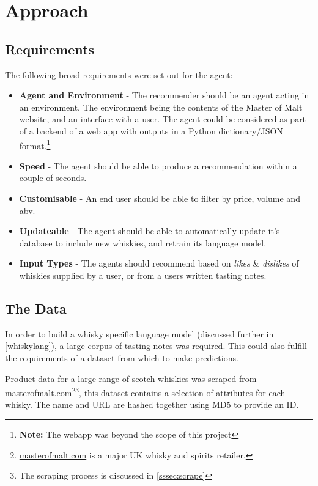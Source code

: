 \section{Approach}\label{sec:approach}
\subsection{Requirements}
The following broad requirements were set out for the agent:
\begin{itemize}
    \item \textbf{Agent and Environment} - The recommender should be an agent acting in an environment. 
    The environment being the contents of the Master of Malt website, and an interface with a user.
    The agent could be considered as part of a backend of a web app with outputs in a Python dictionary/JSON
    format.\footnote{\textbf{Note:} The webapp was beyond the scope of this project}
    \item \textbf{Speed} - The agent should be able to produce a recommendation
    within a couple of seconds.
    \item \textbf{Customisable} - An end user should be able to filter by price,
    volume and abv.
    \item \textbf{Updateable} - The agent should be able to automatically update
    it's database to include new whiskies, and retrain its language model.
    \item \textbf{Input Types} - The agents should recommend based on \emph{likes} 
    \& \emph{dislikes} of whiskies supplied by a user, or from a users written 
    tasting notes.
\end{itemize}

\subsection{The Data}
In order to build a whisky specific language model (discussed further in
\autoref{whiskylang}), a large corpus of tasting notes was required. This could
also fulfill the requirements of a dataset from which to make predictions.

Product data for a large range of scotch whiskies was scraped from
\href{http://masterofmalt.com/}{masterofmalt.com}\footnote{\href{
http://masterofmalt.com/}{masterofmalt.com} is a major UK whisky 
and spirits retailer.}\footnote{The scraping process is discussed in \autoref{sssec:scrape}}, this dataset contains a selection of attributes for each 
whisky.  The name and URL are hashed together using MD5 to provide an ID.

